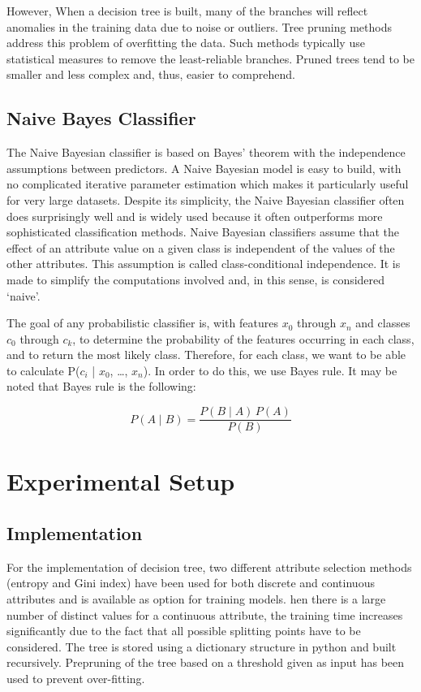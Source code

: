 \documentclass[12pt]{article}
\begin{document}
However, When a decision tree is built, many of the branches will reflect anomalies in the training data due to noise or outliers. Tree pruning methods address this problem of overfitting the data. Such methods typically use statistical measures to remove the least-reliable branches. Pruned trees tend to be smaller and less complex and, thus, easier to comprehend.


\subsection{Naive Bayes Classifier}
		
The Naive Bayesian classifier is based on Bayes’ theorem with the independence assumptions between predictors. A Naive Bayesian model is easy to build, with no complicated iterative parameter estimation which makes it particularly useful for very large datasets. Despite its simplicity, the Naive Bayesian classifier often does surprisingly well and is widely used because it often outperforms more sophisticated classification methods. Naive Bayesian classifiers assume that the effect of an attribute value on a given class is independent of the values of the other attributes. This assumption is called class-conditional independence. It is made to simplify the computations involved and, in this sense, is considered `naive'.

The goal of any probabilistic classifier is, with features $ x_0 $ through $ x_n $ and classes $ c_0 $ through $ c_k $, to determine the probability of the features occurring in each class, and to return the most likely class. Therefore, for each class, we want to be able to calculate P($ c_i $ | $ x_0 $, …, $ x_n $). In order to do this, we use Bayes rule. It may be noted that Bayes rule is the following:

$$ P(A \mid B) = \frac{P(B \mid A) \, P(A)}{P(B)} $$

\section{Experimental Setup}
\subsection{Implementation}
For the implementation of decision tree, two different attribute selection methods (entropy and Gini index) have been used for both discrete and continuous attributes and is available as option for training models. hen there is a large number of distinct values for a continuous attribute, the training time increases significantly due to the fact that all possible splitting points have to be considered. The tree is stored using a dictionary structure in python and built recursively. Prepruning of the tree based on a threshold given as input has been used to prevent over-fitting.
\end{document}
